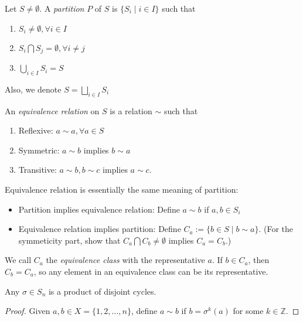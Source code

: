 \begin{definition}[Partition]
Let $S\ne\emptyset$. A \emph{partition} $P$ of $S$ is $\{S_i\mid i\in I\}$ such that
\begin{enumerate}
\item
$S_i\ne\emptyset,\forall i\in I$
\item
$S_i\bigcap S_j=\emptyset,\forall i\ne j$
\item
$\bigcup_{i\in I}S_i=S$
\end{enumerate}
Also, we denote $S=\bigsqcup_{i\in I}S_i$
\end{definition}
\begin{definition}
An \emph{equivalence relation} on $S$ is a relation $\sim $ such that
\begin{enumerate}
\item
Reflexive: $a\sim a,\forall a\in S$
\item
Symmetric: $a\sim b$ implies $b\sim a$
\item
Transitive: $a\sim b,b\sim c$ implies $a\sim c$.
\end{enumerate}
\end{definition}
Equivalence relation is essentially the same meaning of partition:
\begin{itemize}
\item
Partition implies equivalence relation: Define $a\sim b$ if $a,b\in S_i$
\item
Equivalence relation implies partition: Define $C_a:=\{b\in S\mid b\sim a\}$. (For the symmeticity part, show that $C_a\bigcap C_b\ne\emptyset$ implies $C_a=C_b$.)
\end{itemize}

We call $C_a$ the \emph{equivalence class} with the representative $a$. If $b\in C_a$, then $C_b=C_a$, so any element in an equivalence class can be its representative.
\begin{proposition}
Any $\sigma\in S_n$ is a product of disjoint cycles.
\end{proposition}
\begin{proof}
Given $a,b\in X=\{1,2,\dots,n\}$, define $a\sim b$ if $b=\sigma^k(a)$ for some $k\in\mathbb{Z}$.
\end{proof}










